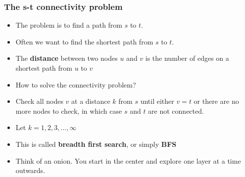\documentclass[trans]{beamer}
\begin{document}
\begin{frame}
\frametitle{The s-t connectivity problem}
\begin{itemize}
\item The problem is to find a path from $s$ to $t$.
\item Often we want to find the shortest path from $s$ to $t$.
\item The {\bf distance} between two nodes $u$ and $v$ is the number of
edges on a shortest path from $u$ to $v$
\item How to solve the connectivity problem? 
\item Check all nodes $v$ at a distance $k$ from $s$ until
either $v = t$ or there are no more nodes to check, in which case $s$ and $t$ are not
connected.
\item Let $k = 1, 2, 3, ..., \infty$
\item This is called {\bf breadth first search}, or simply {\bf BFS}
\item Think of an onion. You start in the center and explore one layer at a time outwards. 
\end{itemize}
\end{frame}
\end{document}
